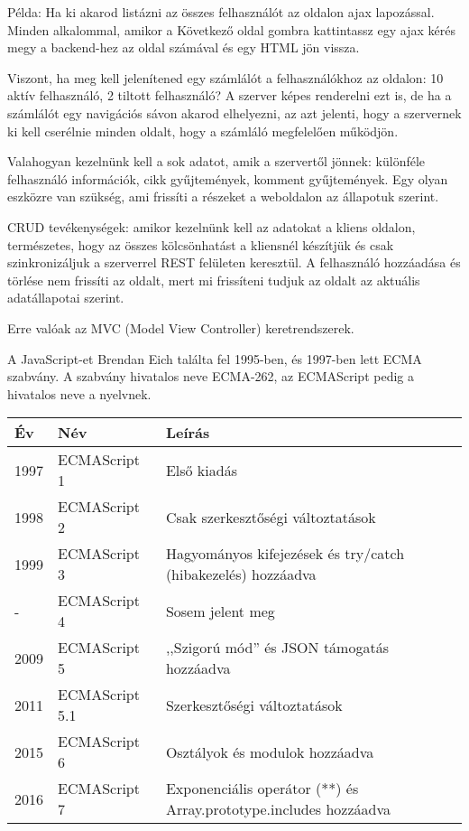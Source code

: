 Példa: Ha ki akarod listázni az összes felhasználót az oldalon ajax lapozással. Minden alkalommal, amikor a Következő oldal gombra kattintassz egy ajax kérés megy a backend-hez az oldal számával és egy HTML jön vissza.

Viszont, ha meg kell jelenítened egy számlálót a felhasználókhoz az oldalon: 10 aktív felhasználó, 2 tiltott felhasználó? A szerver képes renderelni ezt is, de ha a számlálót egy navigációs sávon akarod elhelyezni, az azt jelenti, hogy a szervernek ki kell cserélnie minden oldalt, hogy a számláló megfelelően működjön.

Valahogyan kezelnünk kell a sok adatot, amik a szervertől jönnek: különféle felhasználó információk, cikk gyűjtemények, komment gyűjtemények. Egy olyan eszközre van szükség, ami frissíti a részeket a weboldalon az állapotuk szerint.

CRUD tevékenységek: amikor kezelnünk kell az adatokat a kliens oldalon, természetes, hogy az összes kölcsönhatást a kliensnél készítjük és csak szinkronizáljuk a szerverrel REST felületen keresztül. A felhasználó hozzáadása és törlése nem frissíti az oldalt, mert mi frissíteni tudjuk az oldalt az aktuális adatállapotai szerint.

Erre valóak az MVC (Model View Controller) keretrendszerek.


A JavaScript-et Brendan Eich találta fel 1995-ben, és 1997-ben lett ECMA szabvány.
A szabvány hivatalos neve ECMA-262, az ECMAScript pedig a hivatalos neve a nyelvnek.

\begin{tabular}{|l|l|p{8cm}|}
\hline
\textbf{Év} & \textbf{Név} & \textbf{Leírás} \\
\hline
1997 & ECMAScript 1 & Első kiadás \\
\hline
1998 & ECMAScript 2 & Csak szerkesztőségi változtatások \\
\hline
1999 & ECMAScript 3 & Hagyományos kifejezések és try/catch (hibakezelés) hozzáadva \\
\hline
- & ECMAScript 4 & Sosem jelent meg \\
\hline
2009 & ECMAScript 5 & ,,Szigorú mód'' és JSON támogatás hozzáadva \\
\hline
2011 & ECMAScript 5.1 & Szerkesztőségi változtatások \\
\hline
2015 & ECMAScript 6 & Osztályok és modulok hozzáadva \\
\hline
2016 & ECMAScript 7 & Exponenciális operátor (**) és Array.prototype.includes hozzáadva \\
\hline
\end{tabular}

